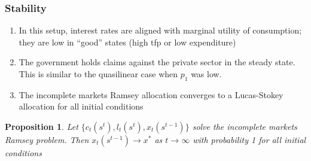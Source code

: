 \documentclass{beamer}
\newcommand{\EE}{\mathbb E}
\newtheorem{proposition}{Proposition}
\begin{document}
%
%
%
\begin{frame}
	\frametitle{Stability}
	\begin{enumerate}
	 \item In this setup, interest rates are aligned with marginal utility of consumption;  they are low  in ``good'' states (high tfp or low expenditure)
	 \item The government holds claims against the private sector in the steady state. This is similar to the quasilinear case when $p_1$ was low.	 
	 \item The incomplete markets Ramsey allocation converges to a Lucas-Stokey allocation for all initial conditions	 	
	\end{enumerate}


	\begin{proposition}  Let $\{c_t(s^t), l_t(s^t), x_t(s^{t-1})\}$ solve the incomplete markets Ramsey problem.  Then  $x_t(s^{t-1})\rightarrow x^*$ as $t\rightarrow \infty$ with probability 1 for all initial conditions
	
	\end{proposition}
	\end{frame}
	
\end{document}
